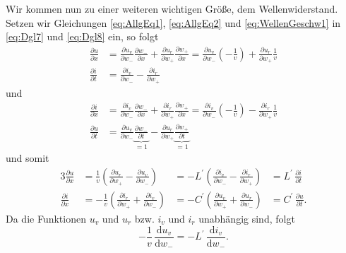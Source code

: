 \documentclass[paper=a4, parskip=half-, ngerman, fontsize=11pt]{scrreprt}
\begin{document}
Wir kommen nun zu einer weiteren wichtigen Größe, dem Wellenwiderstand.
Setzen wir Gleichungen \eqref{eq:AllgEq1}, \eqref{eq:AllgEq2} und \eqref{eq:WellenGeschw1} in \eqref{eq:Dgl7} und
\eqref{eq:Dgl8} ein, so folgt
\begin{align*}
    \frac{\partial u}{\partial x} &= \frac{\partial u_{v}}{\partial w_{-}} \frac{\partial w_{-}}{\partial x}
    + \frac{\partial u_{r}}{\partial w_{+}} \frac{\partial w_{+}}{\partial x}
    =
    \frac{\partial u_{v}}{\partial w_{-}} \left(- \frac{1}{v} \right) + \frac{\partial u_{r}}{\partial w_{+}}
    \frac{1}{v} \\[1ex]
    \frac{\partial i}{\partial t} &= \frac{\partial i_{v}}{\partial w_{-}} - \frac{\partial i_{r}}{\partial w_{+}}
\end{align*}
und
\begin{align*}
    \frac{\partial i}{\partial x} &= \frac{\partial i_{v}}{\partial w_{-}} \frac{\partial w_{-}}{\partial x}
    + \frac{\partial i_{r}}{\partial w_{+}} \frac{\partial w_{+}}{\partial x}
    =
    \frac{\partial i_{v}}{\partial w_{-}} \left(- \frac{1}{v} \right) - \frac{\partial i_{r}}{\partial w_{+}}
    \frac{1}{v} \\[1ex]
    \frac{\partial u}{\partial t} &= \frac{\partial u_{v}}{\partial w_{-}}
    \underbrace{\frac{\partial w_{-}}{\partial t} }_{=1}
    -
    \frac{\partial u_{r}}{\partial w_{+}} \underbrace{\frac{\partial w_{+}}{\partial t} }_{=1}
\end{align*}
und somit
\begin{alignat*}{3}
    \frac{\partial u}{\partial x} &= \frac{1}{v} \left( \frac{\partial u_{r}}{\partial w_{+}} -
    \frac{\partial u_{v}}{\partial w_{-}} \right) &= - L^{\prime} \left( \frac{\partial i_{v}}{\partial w_{-}} -
    \frac{\partial i_{r}}{\partial w_{+}} \right) &= L^{\prime} \, \frac{\partial i}{\partial t} \\[1ex]
    \frac{\partial i}{\partial x} &= - \frac{1}{v} \left( \frac{\partial i_{r}}{\partial w_{+}} +
    \frac{\partial i_{v}}{\partial w_{-}} \right) &= - C^{\prime} \left( \frac{\partial u_{v}}{\partial w_{+}} +
    \frac{\partial u_{r}}{\partial w_{-}} \right) &= C^{\prime} \, \frac{\partial u}{\partial t}.
\end{alignat*}
Da die Funktionen $u_{v}$ und $u_{r}$ bzw. $i_{v}$ und $i_{r}$ unabhängig sind, folgt
\begin{equation}
    - \frac{1}{v} \, \frac{\text{d} u_{v}}{\text{d} w_{-}} = - L^{\prime} \, \frac{\text{d} i_{v}}{\text{d} w_{-}}.
\end{equation}
\end{document}
